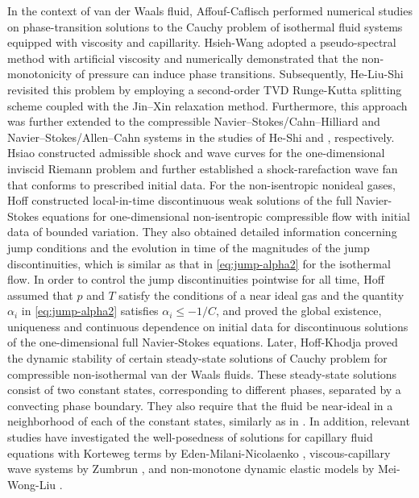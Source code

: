 \documentclass[a4paper,oneside,11pt]{article}
\numberwithin{equation}{section}
\begin{document}
In the context of van der Waals fluid, Affouf-Caflisch \cite{AC1991} performed numerical studies on phase-transition solutions to the Cauchy problem of isothermal fluid systems equipped with viscosity and capillarity.  
Hsieh-Wang \cite{HW1997} adopted a pseudo-spectral method with artificial viscosity and numerically demonstrated that the non-monotonicity of pressure can induce phase transitions. Subsequently, He-Liu-Shi \cite{HLS2018} revisited this problem by employing a second-order TVD Runge-Kutta splitting scheme coupled with the Jin–Xin relaxation method. Furthermore, this approach was further extended to the compressible Navier–Stokes/Cahn–Hilliard and Navier–Stokes/Allen–Cahn systems in the studies of He-Shi \cite{hs2020} and \cite{hs2021}, respectively.
Hsiao \cite{HSIAO1990} constructed admissible shock and wave curves for the one-dimensional inviscid Riemann problem and further established a shock-rarefaction wave fan that conforms to prescribed initial data. 
For the non-isentropic nonideal gases, Hoff \cite{hoff1991} constructed local-in-time discontinuous weak solutions of the full Navier-Stokes equations for one-dimensional non-isentropic compressible flow with initial data of bounded variation. They also obtained detailed information concerning jump conditions and the evolution in time of the magnitudes of the jump discontinuities, which is similar as that in \eqref{eq:jump-alpha2} for the isothermal flow. %
In order to control the jump discontinuities pointwise for all time, Hoff \cite{hoff1992} assumed that $p$ and $T$ satisfy the conditions of a near ideal gas and the quantity $\alpha_i$ in \eqref{eq:jump-alpha2} satisfies $\alpha_i\leq -1/C$, and proved the global existence, uniqueness and continuous dependence on initial data for discontinuous solutions of the one-dimensional full Navier-Stokes equations. 
Later, Hoff-Khodja \cite{hk1993} proved the dynamic stability of certain steady-state solutions of Cauchy problem for compressible non-isothermal van der Waals fluids. These steady-state solutions consist of two constant states, corresponding to different phases, separated by a convecting phase boundary. They also require that the fluid be near-ideal in a neighborhood of each of the constant states, similarly as in \cite{hoff1992}. 
In addition, relevant studies have investigated the well-posedness of solutions for capillary fluid equations with Korteweg terms by Eden-Milani-Nicolaenko \cite{EMN1993}, viscous-capillary wave systems by Zumbrun \cite{Z2000}, and non-monotone dynamic elastic models by Mei-Wong-Liu \cite{MLW2007,MLW2007-2}.
\end{document}
